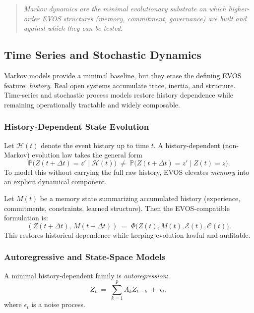 \documentclass[11pt]{article}
\begin{document}
\begin{quote}
\emph{Markov dynamics are the minimal evolutionary substrate on which higher-order EVOS
structures (memory, commitment, governance) are built and against which they can be
tested.}
\end{quote}


\vspace{3mm}

\subsection{Time Series and Stochastic Dynamics}
\label{sec:timeseries}

Markov models provide a minimal baseline, but they erase the defining EVOS feature:
\emph{history}. Real open systems accumulate trace, inertia, and structure. Time-series
and stochastic process models restore history dependence while remaining operationally
tractable and widely composable.

\subsubsection{History-Dependent State Evolution}

Let $\mathcal{H}(t)$ denote the event history up to time $t$. A history-dependent (non-Markov)
evolution law takes the general form
\[
\mathbb{P}\!\big(Z(t+\Delta t)=z' \mid \mathcal{H}(t)\big)
\;\neq\;
\mathbb{P}\!\big(Z(t+\Delta t)=z' \mid Z(t)=z\big).
\]
To model this without carrying the full raw history, EVOS elevates \emph{memory} into an
explicit dynamical component.

Let $M(t)$ be a memory state summarizing accumulated history (experience, commitments,
constraints, learned structure). Then the EVOS-compatible formulation is:
\[
(Z(t+\Delta t),\, M(t+\Delta t)) \;=\;
\Phi\!\big(Z(t), M(t), \mathcal{E}(t), \mathcal{C}(t)\big).
\]
This restores historical dependence while keeping evolution lawful and auditable.

\subsubsection{Autoregressive and State-Space Models}

A minimal history-dependent family is \emph{autoregression}:
\[
Z_t \;=\; \sum_{k=1}^{p} A_k Z_{t-k} \;+\; \epsilon_t,
\]
where $\epsilon_t$ is a noise process.
\end{document}
